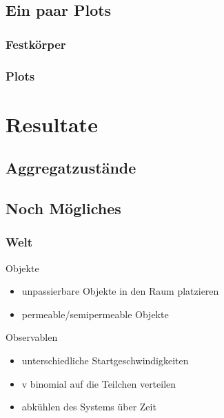 \documentclass[11pt]{beamer}
\begin{document}
\subsection{Ein paar Plots}

\begin{frame} %
\frametitle{Festkörper}
  \vspace*{-0.3cm}
      \centering
{}
\end{frame}

\begin{frame}
\frametitle{Plots}
  \vspace*{-0.3cm}
\end{frame}


\section{Resultate}

\subsection{Aggregatzustände} %



\subsection{Noch Mögliches} %

\begin{frame}
  \frametitle{Welt}
    \vspace*{-0.3cm}
  \begin{block}{Objekte}
    \begin{itemize} 
      \item unpassierbare Objekte in den Raum platzieren
      \item permeable/semipermeable Objekte
    \end{itemize}
  \end{block}
    \pause
  \begin{block}{Observablen}
    \begin{itemize} 
      \item unterschiedliche Startgeschwindigkeiten
      \item v binomial auf die Teilchen verteilen
      \item abkühlen des Systems über Zeit
    \end{itemize}
  \end{block}
\end{frame}
\end{document}
